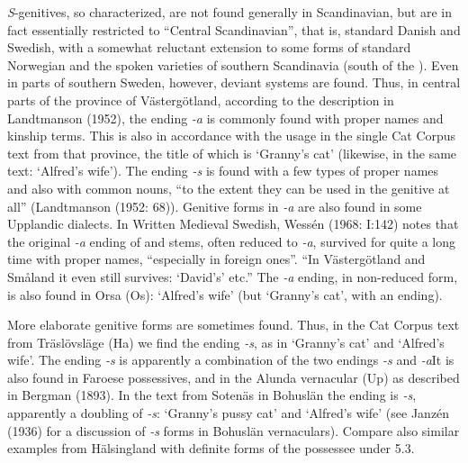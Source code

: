 \textit{S}{}-genitives, so characterized, are not found generally in Scandinavian, but are in fact essentially restricted to “Central Scandinavian”, that is, standard Danish and Swedish, with a somewhat reluctant extension to some forms of standard Norwegian and the spoken varieties of southern Scandinavia (south of the ). Even in parts of southern Sweden, however, deviant systems are found. Thus, in central parts of the province of Västergötland, according to the description in Landtmanson (1952), the ending\textit{ {}-a} is commonly found with proper names and kinship terms. This is also in accordance with the usage in the single Cat Corpus text from that province, the title of which is  ‘Granny’s cat’ (likewise, in the same text:  ‘Alfred’s wife’). The ending\textit{ {}-s} is found with a few types of proper names and also with common nouns, “to the extent they can be used in the genitive at all” (Landtmanson (1952: 68)). Genitive forms in\textit{ {}-a} are also found in some Upplandic dialects. In Written Medieval Swedish, Wessén (1968: I:142) notes that the original\textit{ {}-a} ending of  and stems, often reduced to\textit{ }\textit{{}-}\textit{a},  survived for quite a long time with proper names, “especially in foreign ones”. “In Västergötland and Småland it even still survives:  ‘David’s’ etc.” The\textit{ {}-a} ending, in non-reduced form, is also found in Orsa (Os):  ‘Alfred’s wife’ (but  ‘Granny’s cat’, with an ending).

 More elaborate genitive forms are sometimes found. Thus, in the Cat Corpus text from Träslövsläge (Ha) we find the ending\textit{ {}-s}, as in ‘Granny’s cat’ and ‘Alfred’s wife’. The ending\textit{ {}-s} is apparently a combination of the two endings\textit{ {}-s} and\textit{ {}-a}It is also found in Faroese possessives, and in the Alunda vernacular (Up) as described in Bergman (1893). In the text from Sotenäs in Bohuslän the ending is\textit{ {}-s}, apparently a doubling of\textit{ {}-s}:  ‘Granny’s pussy cat’ and  ‘Alfred’s wife’ (see Janzén (1936) for a discussion of\textit{ {}-s} forms in Bohuslän vernaculars). Compare also similar examples from Hälsingland with definite forms of the possessee under 5.3. 

